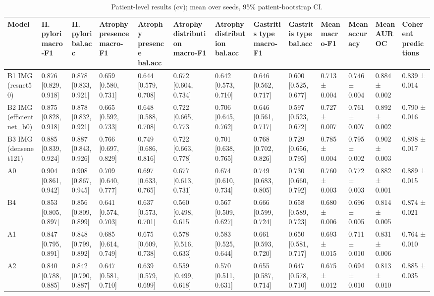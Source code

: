\begin{table}
\caption{Patient-level results (cv); mean over seeds, 95\% patient-bootstrap CI.}
\label{tab:table3_main}
\begin{tabular}{lllllllllllll}
\toprule
Model & H. pylori macro-F1 & H. pylori bal.acc & Atrophy presence macro-F1 & Atrophy presence bal.acc & Atrophy distribution macro-F1 & Atrophy distribution bal.acc & Gastritis type macro-F1 & Gastritis type bal.acc & Mean macro-F1 & Mean accuracy & Mean AUROC & Coherent predictions \\
\midrule
B1 IMG (resnet50) & 0.876 [0.829, 0.918] & 0.878 [0.833, 0.921] & 0.659 [0.580, 0.731] & 0.644 [0.579, 0.708] & 0.672 [0.604, 0.734] & 0.642 [0.573, 0.710] & 0.646 [0.562, 0.717] & 0.600 [0.525, 0.677] & 0.713 ± 0.004 & 0.746 ± 0.004 & 0.884 ± 0.002 & 0.839 ± 0.014 \\
B2 IMG (efficientnet\_b0) & 0.875 [0.828, 0.918] & 0.878 [0.832, 0.921] & 0.665 [0.592, 0.733] & 0.648 [0.588, 0.708] & 0.722 [0.665, 0.773] & 0.706 [0.645, 0.762] & 0.646 [0.561, 0.717] & 0.597 [0.523, 0.672] & 0.727 ± 0.007 & 0.761 ± 0.007 & 0.892 ± 0.002 & 0.790 ± 0.016 \\
B3 IMG (densenet121) & 0.885 [0.839, 0.924] & 0.887 [0.843, 0.926] & 0.766 [0.697, 0.829] & 0.749 [0.686, 0.816] & 0.722 [0.663, 0.778] & 0.701 [0.638, 0.765] & 0.768 [0.702, 0.826] & 0.729 [0.656, 0.795] & 0.785 ± 0.004 & 0.795 ± 0.002 & 0.902 ± 0.003 & 0.898 ± 0.017 \\
A0 & 0.904 [0.861, 0.942] & 0.908 [0.867, 0.945] & 0.709 [0.640, 0.777] & 0.697 [0.633, 0.765] & 0.677 [0.613, 0.731] & 0.674 [0.610, 0.734] & 0.749 [0.683, 0.805] & 0.730 [0.660, 0.792] & 0.760 ± 0.003 & 0.772 ± 0.003 & 0.882 ± 0.001 & 0.889 ± 0.015 \\
B4 & 0.853 [0.805, 0.897] & 0.856 [0.809, 0.899] & 0.641 [0.574, 0.703] & 0.637 [0.573, 0.701] & 0.560 [0.498, 0.615] & 0.567 [0.509, 0.627] & 0.666 [0.599, 0.724] & 0.658 [0.589, 0.723] & 0.680 ± 0.006 & 0.696 ± 0.005 & 0.814 ± 0.005 & 0.874 ± 0.021 \\
A1 & 0.847 [0.795, 0.891] & 0.848 [0.799, 0.892] & 0.685 [0.614, 0.749] & 0.675 [0.609, 0.738] & 0.578 [0.516, 0.633] & 0.583 [0.525, 0.644] & 0.661 [0.593, 0.720] & 0.650 [0.581, 0.717] & 0.693 ± 0.015 & 0.711 ± 0.010 & 0.831 ± 0.006 & 0.764 ± 0.010 \\
A2 & 0.840 [0.788, 0.885] & 0.842 [0.790, 0.887] & 0.647 [0.581, 0.710] & 0.639 [0.579, 0.699] & 0.559 [0.499, 0.618] & 0.570 [0.511, 0.631] & 0.655 [0.587, 0.714] & 0.647 [0.578, 0.710] & 0.675 ± 0.012 & 0.694 ± 0.010 & 0.813 ± 0.010 & 0.885 ± 0.035 \\

\end{tabular}
\end{table}
